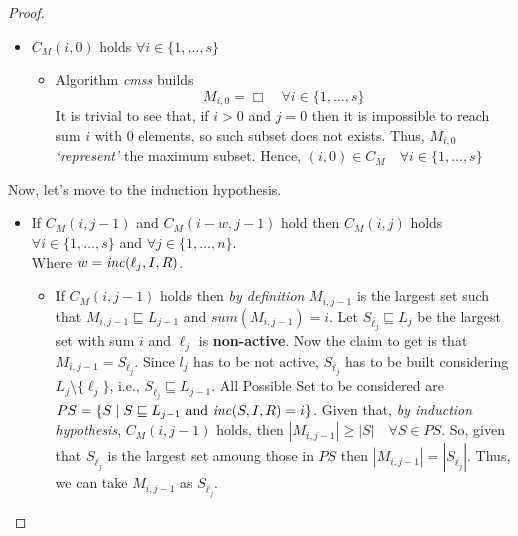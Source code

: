 \begin{proof}
\begin{itemize}
\begin{itemize}
    \end{itemize}
    \item $C_M(i,0)$ holds $\forall i \in \{1, \hdots, s\}$
    \begin{itemize}
        \item Algorithm \textit{cmss} builds 
        $$M_{i,0} = \Box \quad \forall i \in \{1, \hdots , s\}$$
        It is trivial to see that, if $i > 0$ and $j = 0$ then it is impossible 
        to reach sum $i$ with $0$ elements, so such subset does not exists.
        Thus, $M_{i,0}$ \textit{`represent'} the maximum subset.
        Hence, $(i,0) \in C_M \quad \forall i \in \{1, \hdots, s\}$ 
    \end{itemize}
   \end{itemize}
   Now, let's move to the induction hypothesis.
   \begin{itemize}
    \item If $C_M(i,j-1)$ and $C_M(i-w,j-1)$ hold then $C_M(i,j)$ holds $\forall i \in \{1,\hdots,s\}$
    and $\forall j \in \{1, \hdots, n\}$.
    \\ Where $w = \mathit{inc}(\ell_j,I,R)$.
    \begin{itemize}
        \item If $C_M(i,j-1)$ holds then \textit{by definition} $M_{i,j-1}$ is the largest set 
            such that $M_{i,j-1} \sqsubseteq L_{j-1}$ and $\mathit{sum}(M_{i,j-1}) = i$.
            Let $S_{\overline{\ell_j}} \sqsubseteq L_j$ be the largest set with sum $i$
            and $\ell_j$ is \textbf{non-active}.
            Now the claim to get is that $M_{i,j-1} = S_{\overline{\ell_j}}$.
            Since $l_j$ has to be not active, $S_{\overline{\ell_j}}$ has to be built considering $L_j \setminus \{\ell_j\}$,
            i.e., $S_{\overline{\ell_j}} \sqsubseteq L_{j-1}$.
            All Possible Set to be considered are $PS = \{S \mid S \sqsubseteq L_{j-1} \text{ and } \mathit{inc}(S,I,R) = i\}$.
            Given that, \textit{by induction hypothesis}, $C_M(i,j-1)$ holds, then $|M_{i,j-1}| \ge |S| \quad \forall S \in PS$.
            So, given that $S_{\overline{\ell_j}}$ is the largest set amoung those in $PS$ then 
            $|M_{i,j-1}| =|S_{\overline{\ell_j}}|$.
            Thus, we can take $M_{i,j-1}$ as $S_{\overline{\ell_j}}$.\\


\end{itemize}
\end{itemize}
\end{proof}
